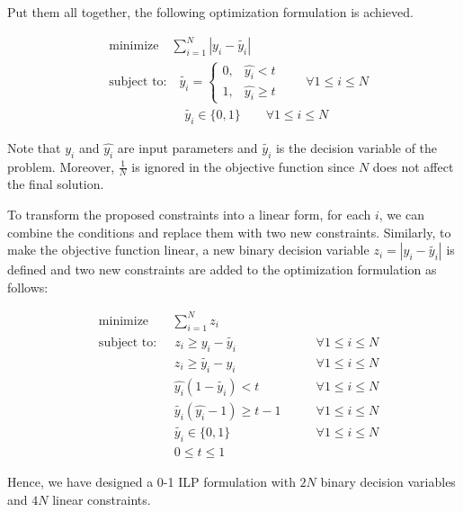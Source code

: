 \documentclass[a4paper]{article}
\begin{document}
Put them all together, the following optimization formulation is achieved.

\begin{equation}
\begin{aligned}
	&\text{minimize} \quad \sum_{i=1}^{N} |y_i - \tilde{y_i}| \\
	&\text{subject to:} \quad \tilde{y_i} = 
	\begin{cases}
	0, & \hat{y_i} < t \\
	1, & \hat{y_i} \ge t
	\end{cases} \qquad \forall 1\le i \le N\\
	& \qquad \qquad \qquad \tilde{y_i} \in \{0, 1\} \qquad \forall 1\le i \le N
\end{aligned}
\end{equation}

Note that $y_i$ and $\hat{y_i}$ are input parameters and $\tilde{y_i}$ is the decision variable of the problem. Moreover, $\frac{1}{N}$ is ignored in the objective function since $N$ does not affect the final solution.

To transform the proposed constraints into a linear form, for each $i$, we can combine the conditions and replace them with two new constraints. Similarly, to make the objective function linear, a new binary decision variable $z_i=|y_i - \tilde{y_i}|$ is defined and two new constraints are added to the optimization formulation as follows:

\begin{equation}
\begin{aligned}
&\text{minimize} \quad \: \: \: \: \sum_{i=1}^{N} z_i \\
&\text{subject to:} \quad \: \: z_i \ge y_i - \tilde{y_i} \qquad &\forall 1\le i \le N\\
& \qquad \qquad \qquad z_i \ge \tilde{y_i}  - y_i \qquad &\forall 1\le i \le N\\
& \qquad \qquad \qquad \hat{y_i} (1 - \tilde{y_i}) < t \qquad &\forall 1\le i \le N\\
& \qquad \qquad \qquad  \tilde{y_i} (\hat{y_i} - 1) \ge t - 1 \qquad &\forall 1\le i \le N\\
& \qquad \qquad \qquad \tilde{y_i} \in \{0, 1\} \qquad &\forall 1\le i \le N \\
& \qquad \qquad \qquad 0 \le t \le 1
\end{aligned}
\end{equation}

Hence, we have designed a 0-1 ILP formulation with $2N$ binary decision variables and $4N$ linear constraints.
\end{document}
